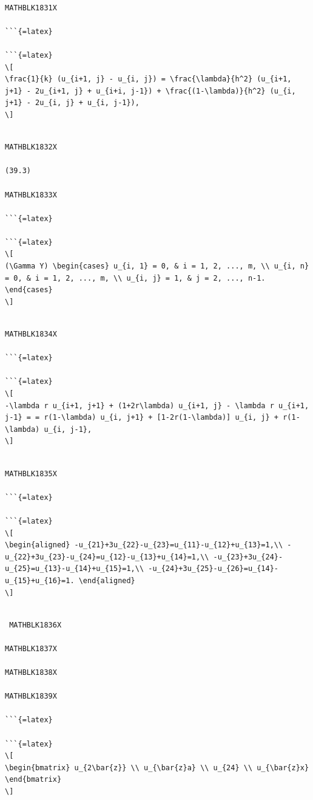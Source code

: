 \documentclass[
  ukrainian,
]{article}
\begin{document}
\begin{verbatim}

MATHBLK1831X

```{=latex}

```{=latex}
\[
\frac{1}{k} (u_{i+1, j} - u_{i, j}) = \frac{\lambda}{h^2} (u_{i+1, j+1} - 2u_{i+1, j} + u_{i+i, j-1}) + \frac{(1-\lambda)}{h^2} (u_{i, j+1} - 2u_{i, j} + u_{i, j-1}),
\]
\end{verbatim}

\begin{verbatim}

MATHBLK1832X

(39.3)

MATHBLK1833X

```{=latex}

```{=latex}
\[
(\Gamma Y) \begin{cases} u_{i, 1} = 0, & i = 1, 2, ..., m, \\ u_{i, n} = 0, & i = 1, 2, ..., m, \\ u_{i, j} = 1, & j = 2, ..., n-1. \end{cases}
\]
\end{verbatim}

\begin{verbatim}

MATHBLK1834X

```{=latex}

```{=latex}
\[
-\lambda r u_{i+1, j+1} + (1+2r\lambda) u_{i+1, j} - \lambda r u_{i+1, j-1} = = r(1-\lambda) u_{i, j+1} + [1-2r(1-\lambda)] u_{i, j} + r(1-\lambda) u_{i, j-1},
\]
\end{verbatim}

\begin{verbatim}

MATHBLK1835X

```{=latex}

```{=latex}
\[
\begin{aligned} -u_{21}+3u_{22}-u_{23}=u_{11}-u_{12}+u_{13}=1,\\ -u_{22}+3u_{23}-u_{24}=u_{12}-u_{13}+u_{14}=1,\\ -u_{23}+3u_{24}-u_{25}=u_{13}-u_{14}+u_{15}=1,\\ -u_{24}+3u_{25}-u_{26}=u_{14}-u_{15}+u_{16}=1. \end{aligned}
\]
\end{verbatim}

\begin{verbatim}

 MATHBLK1836X

MATHBLK1837X

MATHBLK1838X

MATHBLK1839X

```{=latex}

```{=latex}
\[
\begin{bmatrix} u_{2\bar{z}} \\ u_{\bar{z}a} \\ u_{24} \\ u_{\bar{z}x} \end{bmatrix}
\]
\end{verbatim}
\end{document}
